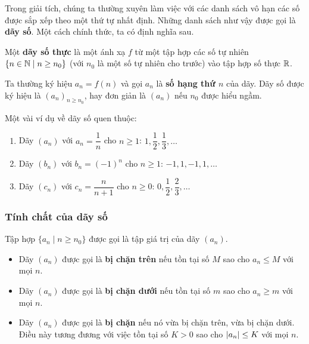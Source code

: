 Trong giải tích, chúng ta thường xuyên làm việc với các danh sách vô hạn các số được sắp xếp theo một thứ tự nhất định. Những danh sách như vậy được gọi là \textbf{dãy số}. Một cách chính thức, ta có định nghĩa sau.

\begin{definition}
Một \textbf{dãy số thực} là một ánh xạ $f$ từ một tập hợp các số tự nhiên $\{n \in \mathbb{N} \mid n \ge n_0\}$ (với $n_0$ là một số tự nhiên cho trước) vào tập hợp số thực $\mathbb{R}$.

Ta thường ký hiệu $a_n = f(n)$ và gọi $a_n$ là \textbf{số hạng thứ $n$} của dãy. Dãy số được ký hiệu là $(a_n)_{n \ge n_0}$, hay đơn giản là $(a_n)$ nếu $n_0$ được hiểu ngầm.
\end{definition}

\begin{example}
Một vài ví dụ về dãy số quen thuộc:
\begin{enumerate}
    \item Dãy $(a_n)$ với $a_n = \dfrac{1}{n}$ cho $n \ge 1$: $1, \dfrac{1}{2}, \dfrac{1}{3}, \dots$
    \item Dãy $(b_n)$ với $b_n = (-1)^n$ cho $n \ge 1$: $-1, 1, -1, 1, \dots$
    \item Dãy $(c_n)$ với $c_n = \dfrac{n}{n+1}$ cho $n \ge 0$: $0, \dfrac{1}{2}, \dfrac{2}{3}, \dots$
\end{enumerate}
\end{example}

\subsubsection{Tính chất của dãy số}

\begin{definition}
Tập hợp $\{a_n \mid n \ge n_0\}$ được gọi là tập giá trị của dãy $(a_n)$.
\begin{itemize}
    \item Dãy $(a_n)$ được gọi là \textbf{bị chặn trên} nếu tồn tại số $M$ sao cho $a_n \le M$ với mọi $n$.
    \item Dãy $(a_n)$ được gọi là \textbf{bị chặn dưới} nếu tồn tại số $m$ sao cho $a_n \ge m$ với mọi $n$.
    \item Dãy $(a_n)$ được gọi là \textbf{bị chặn} nếu nó vừa bị chặn trên, vừa bị chặn dưới. Điều này tương đương với việc tồn tại số $K > 0$ sao cho $\left\lvert a_n \right\rvert \le K$ với mọi $n$.
\end{itemize}
\end{definition}

